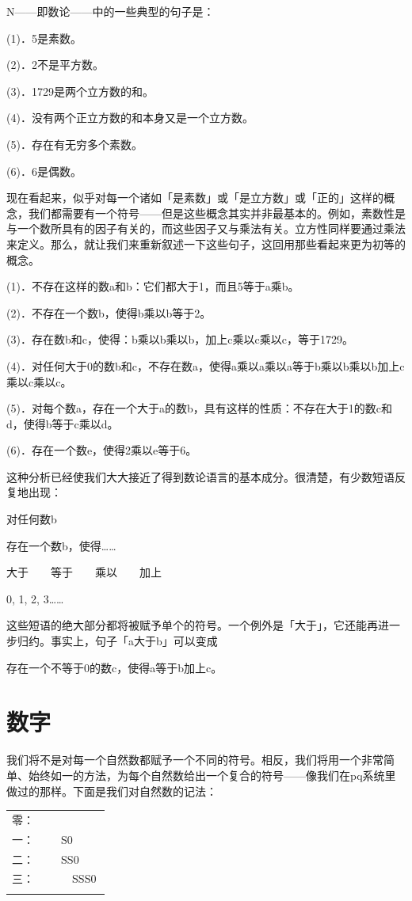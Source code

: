 \documentclass[
  12pt,
  twoside,
  openright,
  oldfontcommands,
]{memoir}
\begin{document}
N------即数论------中的一些典型的句子是：

(1)．5是素数。

(2)．2不是平方数。

(3)．1729是两个立方数的和。

(4)．没有两个正立方数的和本身又是一个立方数。

(5)．存在有无穷多个素数。

(6)．6是偶数。

现在看起来，似乎对每一个诸如「是素数」或「是立方数」或「正的」这样的概念，我们都需要有一个符号------但是这些概念其实并非最基本的。例如，素数性是与一个数所具有的因子有关的，而这些因子又与乘法有关。立方性同样要通过乘法来定义。那么，就让我们来重新叙述一下这些句子，这回用那些看起来更为初等的概念。

(1)\textquotesingle．不存在这样的数a和b：它们都大于1，而且5等于a乘b。

(2)\textquotesingle．不存在一个数b，使得b乘以b等于2。

(3)\textquotesingle．存在数b和c，使得：b乘以b乘以b，加上c乘以c乘以c，等于1729。

(4)\textquotesingle．对任何大于0的数b和c，不存在数a，使得a乘以a乘以a等于b乘以b乘以b加上c乘以c乘以c。

(5)\textquotesingle．对每个数a，存在一个大于a的数b，具有这样的性质：不存在大于1的数c和d，使得b等于c乘以d。

(6)\textquotesingle．存在一个数e，使得2乘以e等于6。

这种分析已经使我们大大接近了得到数论语言的基本成分。很清楚，有少数短语反复地出现：

对任何数b

存在一个数b，使得\ldots\ldots{}

大于　　等于　　乘以　　加上

0, 1, 2, 3\ldots\ldots{}

这些短语的绝大部分都将被赋予单个的符号。一个例外是「大于」，它还能再进一步归约。事实上，句子「a大于b」可以变成

存在一个不等于0的数c，使得a等于b加上c。

\section{数字}

我们将不是对每一个自然数都赋予一个不同的符号。相反，我们将用一个非常简单、始终如一的方法，为每个自然数给出一个复合的符号------像我们在pq系统里做过的那样。下面是我们对自然数的记法：

\begin{longtable}[]{>{\raggedright\arraybackslash}p{0.47\linewidth} >{\raggedright\arraybackslash}p{0.47\linewidth}}
\toprule\noalign{}
\endhead
\bottomrule\noalign{}
\endlastfoot
零： & 0 \\
一： & S0 \\
二： & SS0 \\
三： & 　SSS0 \\
\multicolumn{2}{@{}l@{}}{%
等等} \\
\end{longtable}
\end{document}
